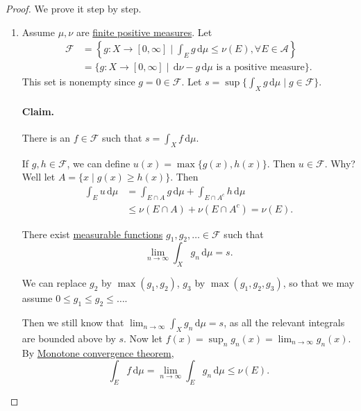 \begin{proof}
	We prove it step by step.
	\begin{enumerate}
		\item Assume \(\mu, \nu\) are \hyperref[def:finite-signed-measure]{finite positive measures}. Let
		      \begin{align*}
			      \mathscr{F} & = \left\{g \colon X \to [0,\infty] \mid \int_E g \,\mathrm{d} \mu \leq \nu(E), \forall E \in \mathcal{A}\right\} \\
			                  & = \{g \colon X \to [0,\infty] \mid \,\mathrm{d} \nu - g\,\mathrm{d} \mu \text{ is a positive measure}\}.
		      \end{align*}
		      This set is nonempty since \(g = 0 \in \mathscr{F}\). Let \(s = \sup\{\int_X g \,\mathrm{d} \mu \mid g \in \mathscr{F}\}\).

		      \paragraph{Claim.} There is an \(f \in \mathscr{F}\) such that \(s = \int_X f \,\mathrm{d} \mu\).
		      \begin{mdframed}[skipabove=0.1in,skipbelow=0.1in]
			      If \(g, h \in \mathscr{F}\), we can define \(u(x) = \max\{g(x),h(x)\}\). Then \(u \in \mathscr{F}\). Why? Well let \(A = \{x \mid g(x) \geq h(x)\}\). Then
			      \begin{align*}
				      \int_E u \,\mathrm{d} \mu & = \int_{E \cap A} g \,\mathrm{d} \mu + \int_{E \cap A^c} h \,\mathrm{d} \mu \\
				                                & \leq \nu(E \cap A) + \nu(E \cap A^c) = \nu(E).
			      \end{align*}

			      There exist \hyperref[def:measurable-function]{measurable functions} \(g_1,g_2,\ldots \in \mathscr{F}\) such that
			      \[
				      \lim_{n \to \infty} \int_X g_n \,\mathrm{d} \mu = s.
			      \]

			      We can replace \(g_2\) by \(\max(g_1,g_2)\), \(g_3\) by \(\max(g_1,g_2,g_3)\), so that we may assume \(0 \leq g_1 \leq g_2 \leq \ldots\).

			      Then we still know that \(\lim_{n \to \infty} \int_X g_n \,\mathrm{d} \mu = s\), as all the relevant integrals are bounded above by \(s\).
			      Now let \(f(x) = \sup_n g_n(x) = \lim_{n \to \infty} g_n(x)\). By \hyperref[thm:MCT]{Monotone convergence theorem},
			      \[
				      \int_E f \,\mathrm{d} \mu = \lim_{n \to \infty} \int_E g_n \,\mathrm{d} \mu \leq \nu(E).
			      \]


\end{mdframed}
\end{enumerate}
\end{proof}
